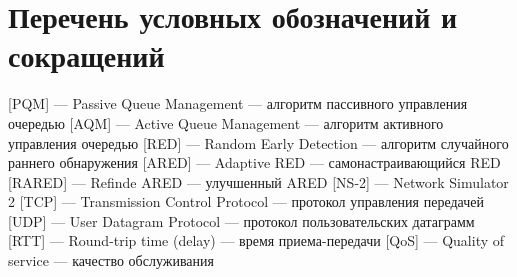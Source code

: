 
\label{abbrv}
\chapter*{Перечень условных обозначений и сокращений}


\begin{acronym}
        [PQM]{ --- Passive Queue Management --- алгоритм пассивного управления очередью}
        [AQM]{ --- Active Queue Management --- алгоритм активного управления очередью}
        [RED]{ --- Random Early Detection --- алгоритм случайного раннего обнаружения}
        [ARED]{ --- Adaptive RED --- самонастраивающийся RED}
        [RARED]{ --- Refinde ARED --- улучшенный ARED}
        [NS-2]{ --- Network Simulator 2}
        [TCP]{ --- Transmission Control Protocol --- протокол управления передачей}
        [UDP]{ --- User Datagram Protocol --- протокол пользовательских датаграмм}
        [RTT]{ --- Round-trip time (delay) --- время приема-передачи}
        [QoS]{ --- Quality of service --- качество обслуживания}
\end{acronym}


\newpage
